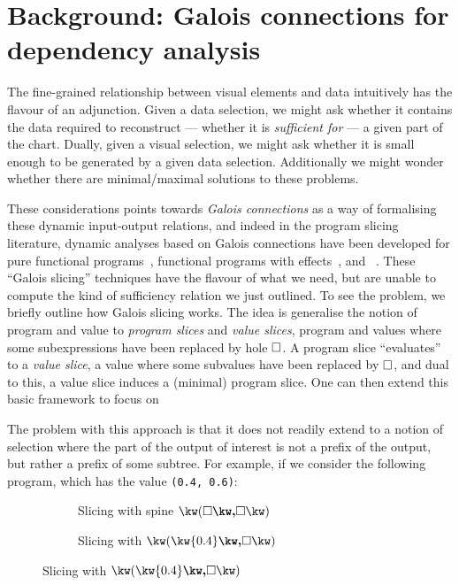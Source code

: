 \section{Background: Galois connections for dependency analysis}
\label{sec:background}



The fine-grained relationship between visual elements and data intuitively has the flavour of an adjunction. Given a data selection, we might ask whether it contains the data required to reconstruct --- whether it is \emph{sufficient for} --- a given part of the chart. Dually, given a visual selection, we might ask whether it is small enough to be generated by a given data selection. Additionally we might wonder whether there are minimal/maximal solutions to these problems.

These considerations points towards \emph{Galois connections} as a way of formalising these dynamic input-output relations, and indeed in the program slicing literature, dynamic analyses based on Galois connections have been developed for pure functional programs~\cite{perera12a}, functional programs with effects~\cite{ricciotti17}, and \piCalculus~\cite{perera16d}. These ``Galois slicing'' techniques have the flavour of what we need, but are unable to compute the kind of sufficiency relation we just outlined. To see the problem, we briefly outline how Galois slicing works. The idea is generalise the notion of program and value to \emph{program slices} and \emph{value slices}, program and values where some subexpressions have been replaced by hole $\square$. A program slice ``evaluates'' to a \emph{value slice}, a value where some subvalues have been replaced by $\square$, and dual to this, a value slice induces a (minimal) program slice. One can then extend this basic framework to focus on

The problem with this approach is that it does not readily extend to a notion of selection where the part of the output of interest is not a prefix of the output, but rather a prefix of some subtree. For example, if we consider the following program, which has the value \lstinline{(0.4, 0.6)}:

\begin{figure}[H]
   \small
   \begin{subfigure}{0.32\textwidth}
      {}
   \caption{Slicing with spine $\exPair{\hole}{\hole}$}
   \end{subfigure}
   \begin{subfigure}{0.32\textwidth}
      {}
   \caption{Slicing with $\exPair{\kw{0.4}}{\hole}$}
   \end{subfigure}
\end{figure}

